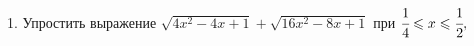 1. Упростить выражение $\sqrt{4x^2-4x+1}+\sqrt{16x^2-8x+1}$ при $\cfrac{1}{4}\leqslant x\leqslant\cfrac{1}{2},$\\
